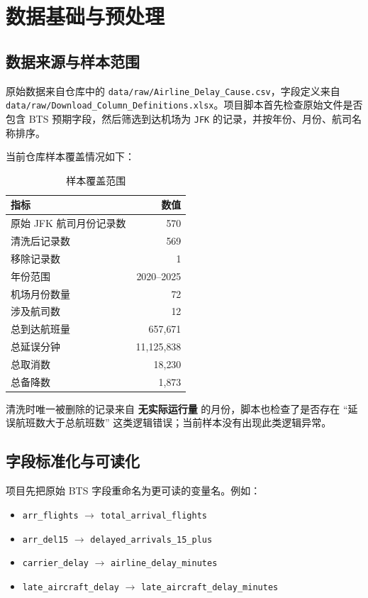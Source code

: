 \section{数据基础与预处理}

\subsection{数据来源与样本范围}

原始数据来自仓库中的 \texttt{data/raw/Airline\_Delay\_Cause.csv}，字段定义来自 \texttt{data/raw/Download\_Column\_Definitions.xlsx}。项目脚本首先检查原始文件是否包含 BTS 预期字段，然后筛选到达机场为 \texttt{JFK} 的记录，并按年份、月份、航司名称排序。

当前仓库样本覆盖情况如下：
\begin{table}[H]
\centering
\caption{样本覆盖范围}
\begin{tabular}{lr}
\toprule
指标 & 数值 \\
\midrule
原始 JFK 航司月份记录数 & 570 \\
清洗后记录数 & 569 \\
移除记录数 & 1 \\
年份范围 & 2020--2025 \\
机场月份数量 & 72 \\
涉及航司数 & 12 \\
总到达航班量 & 657{,}671 \\
总延误分钟 & 11{,}125{,}838 \\
总取消数 & 18{,}230 \\
总备降数 & 1{,}873 \\
\bottomrule
\end{tabular}
\end{table}

清洗时唯一被删除的记录来自 \textbf{无实际运行量} 的月份，脚本也检查了是否存在 ``延误航班数大于总航班数'' 这类逻辑错误；当前样本没有出现此类逻辑异常。

\subsection{字段标准化与可读化}

项目先把原始 BTS 字段重命名为更可读的变量名。例如：
\begin{itemize}[leftmargin=2.2em]
  \item \texttt{arr\_flights} $\rightarrow$ \texttt{total\_arrival\_flights}
  \item \texttt{arr\_del15} $\rightarrow$ \texttt{delayed\_arrivals\_15\_plus}
  \item \texttt{carrier\_delay} $\rightarrow$ \texttt{airline\_delay\_minutes}
  \item \texttt{late\_aircraft\_delay} $\rightarrow$ \texttt{late\_aircraft\_delay\_minutes}
\end{itemize}

